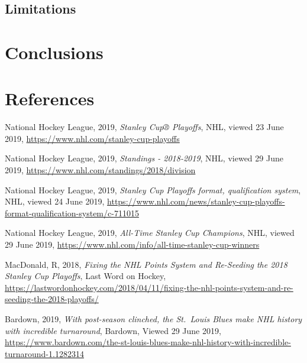 \documentclass[]{article}
\begin{document}
\subsection{Limitations}\label{limitations}

\section{Conclusions}\label{conclusions}

\section{References}\label{references}

National Hockey League, 2019, \emph{Stanley Cup® Playoffs}, NHL, viewed
23 June 2019, \url{https://www.nhl.com/stanley-cup-playoffs}

National Hockey League, 2019, \emph{Standings - 2018-2019}, NHL, viewed
29 June 2019, \url{https://www.nhl.com/standings/2018/division}

National Hockey League, 2019, \emph{Stanley Cup Playoffs format,
qualification system}, NHL, viewed 24 June 2019,
\url{https://www.nhl.com/news/stanley-cup-playoffs-format-qualification-system/c-711015}

National Hockey League, 2019, \emph{All-Time Stanley Cup Champions},
NHL, viewed 29 June 2019,
\url{https://www.nhl.com/info/all-time-stanley-cup-winners}

MacDonald, R, 2018, \emph{Fixing the NHL Points System and Re-Seeding
the 2018 Stanley Cup Playoffs}, Last Word on Hockey,
\url{https://lastwordonhockey.com/2018/04/11/fixing-the-nhl-points-system-and-re-seeding-the-2018-playoffs/}

Bardown, 2019, \emph{With post-season clinched, the St.~Louis Blues make
NHL history with incredible turnaround}, Bardown, Viewed 29 June 2019,
\url{https://www.bardown.com/the-st-louis-blues-make-nhl-history-with-incredible-turnaround-1.1282314}
\end{document}
